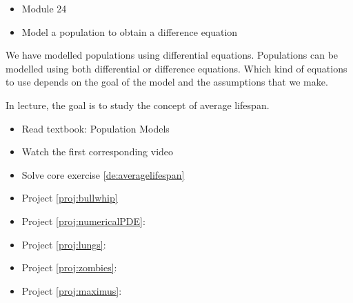\begin{lesson}

	\begin{itemize}
		\item Module 24
	\end{itemize}

	\begin{itemize}
		\item Model a population to obtain a difference equation
	\end{itemize}
	

We have modelled populations using differential equations. Populations can be modelled using both differential or difference equations. Which kind of equations to use depends on the goal of the model and the assumptions that we make.

In lecture, the goal is to study the concept of average lifespan.


\begin{itemize}
	\item Read textbook: Population Models
	\item Watch the first corresponding video
	\item Solve core exercise \ref{de:averagelifespan}
\end{itemize}

\begin{itemize}
	\item Project \ref{proj:bullwhip} \bullwhiptitle
	\item Project \ref{proj:numericalPDE}: \numericalPDEtitle
	\item Project \ref{proj:lungs}:\lungstitle
	\item Project \ref{proj:zombies}: \zombiestitle
	\item Project \ref{proj:maximus}: \maximustitle
\end{itemize}


\end{lesson}




